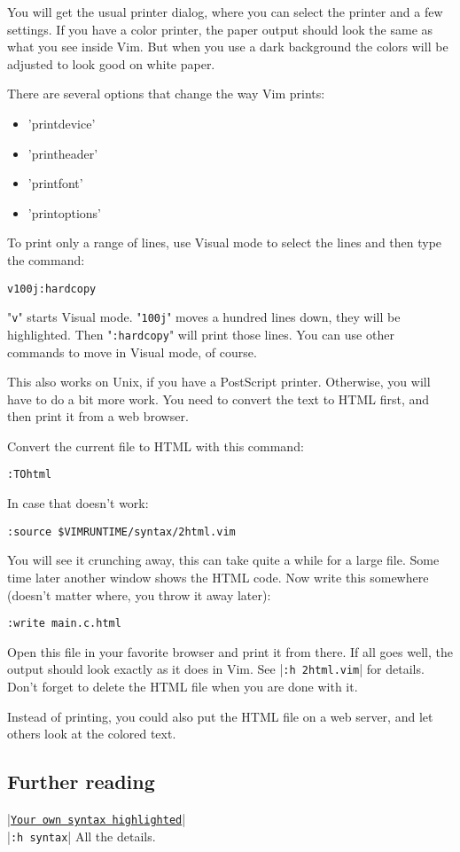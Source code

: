 You will get the usual printer dialog, where you can select the printer and a few settings.
If you have a color printer, the paper output should look the same as what you see inside Vim.
But when you use a dark background the colors will be adjusted to look good on white paper.

There are several options that change the way Vim prints:
\begin{itemize}
				\item 'printdevice'
				\item 'printheader'
				\item 'printfont'
				\item 'printoptions'
\end{itemize}

To print only a range of lines, use Visual mode to select the lines and then type the command:

 \begin{Verbatim}[samepage=true]
 v100j:hardcopy
 \end{Verbatim}

"\verb!v!" starts Visual mode.
"\verb!100j!" moves a hundred lines down, they will be highlighted.
Then "\verb!:hardcopy!" will print those lines.
You can use other commands to move in Visual mode, of course.

This also works on Unix, if you have a PostScript printer.
Otherwise, you will have to do a bit more work.
You need to convert the text to HTML first, and then print it from a web browser.

Convert the current file to HTML with this command:

 \begin{Verbatim}[samepage=true]
 :TOhtml
 \end{Verbatim}

In case that doesn't work:

 \begin{Verbatim}[samepage=true]
 :source $VIMRUNTIME/syntax/2html.vim
 \end{Verbatim}

You will see it crunching away, this can take quite a while for a large file.
Some time later another window shows the HTML code.
Now write this somewhere (doesn't matter where, you throw it away later):

 \begin{Verbatim}[samepage=true]
 :write main.c.html
 \end{Verbatim}

Open this file in your favorite browser and print it from there.
If all goes well, the output should look exactly as it does in Vim.
See |\verb!:h 2html.vim!| for details.
Don't forget to delete the HTML file when you are done with it.

Instead of printing, you could also put the HTML file on a web server, and let others look at the colored text.

\subsection{Further reading}
|\hyperref[Your own syntax highlighted]{\texttt{Your own syntax highlighted}}|\\
|\verb!:h syntax!|      All the details.

\clearpage
